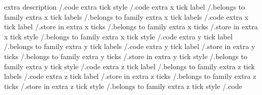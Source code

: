 extra description   /.code
extra tick style    /.code
extra x tick label  /.belongs to family
extra x tick labels /.belongs to family
extra x tick labels /.code
extra x tick label  /.store in
extra x ticks       /.belongs to family
extra x ticks       /.store in
extra x tick style  /.belongs to family
extra x tick style  /.code
extra y tick label  /.belongs to family
extra y tick labels /.code
extra y tick label  /.store in
extra y ticks       /.belongs to family
extra y ticks       /.store in
extra y tick style  /.belongs to family
extra y tick style  /.code
extra z tick label  /.belongs to family
extra z tick labels /.code
extra z tick label  /.store in
extra z ticks       /.belongs to family
extra z ticks       /.store in
extra z tick style  /.belongs to family
extra z tick style  /.code

